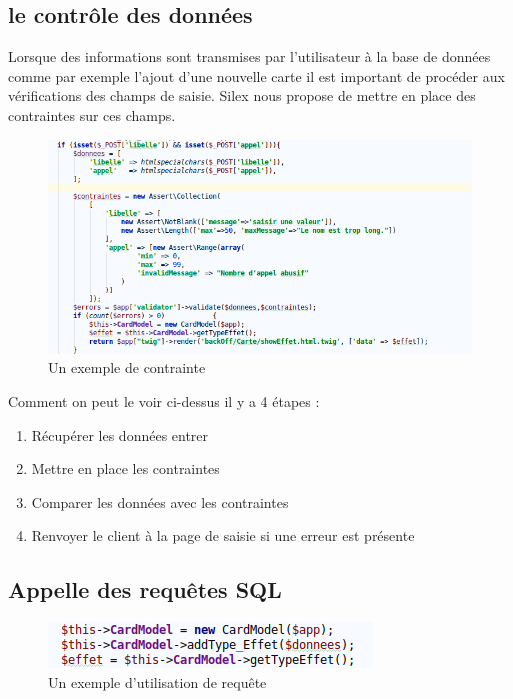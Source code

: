 \documentclass[a4paper, titlepage]{livret}
\begin{document}
	\subsection{le contrôle des données}
	Lorsque des informations sont transmises par l'utilisateur à la base de données comme par exemple l'ajout d'une nouvelle carte il est important de procéder aux vérifications des champs de saisie. Silex nous propose de mettre en place des contraintes sur ces champs.
    \begin{figure}[th]
      \begin{center}
        \includegraphics[scale=0.4]{Assets/exemple_contrainte.png}
        \caption{Un exemple de contrainte}
        \label{fig8}
      \end{center}
    \end{figure}

	Comment on peut le voir ci-dessus il y a 4 étapes :
	\begin{enumerate}
		\item Récupérer les données entrer
		\item Mettre en place les contraintes
		\item Comparer les données avec les contraintes
		\item Renvoyer le client à la page de saisie si une erreur est présente
	\end{enumerate}

	\subsection{Appelle des requêtes SQL}
	 \begin{figure}[th]
     		 \begin{center}
        	\includegraphics[scale=0.4]{Assets/requete.png}
       		 \caption{Un exemple d'utilisation de requête}
       		 \label{fig9}
     		 \end{center}
   	 \end{figure}
	
\end{document}
